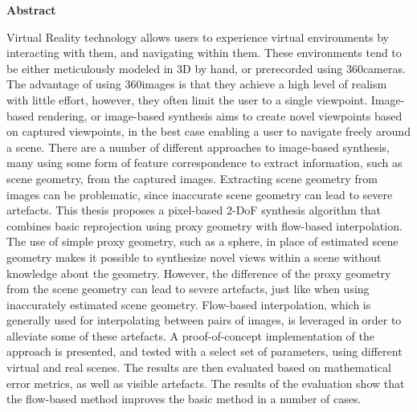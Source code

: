 \vspace*{2cm}

\begin{center}
    \textbf{Abstract}
\end{center}

\vspace*{1cm}

\noindent 
Virtual Reality technology allows users to experience virtual environments by interacting with them, and navigating within them. These environments tend to be either meticulously modeled in 3D by hand, or prerecorded using 360\degree cameras. The advantage of using 360\degree images is that they achieve a high level of realism with little effort, however, they often limit the user to a single viewpoint.
Image-based rendering, or image-based synthesis aims to create novel viewpoints based on captured viewpoints, in the best case enabling a user to navigate freely around a scene.
There are a number of different approaches to image-based synthesis, many using some form of feature correspondence to extract information, such as scene geometry, from the captured images. Extracting scene geometry from images can be problematic, since inaccurate scene geometry can lead to severe artefacts.
This thesis proposes a pixel-based 2-DoF synthesis algorithm that combines basic reprojection using proxy geometry with flow-based interpolation.
The use of simple proxy geometry, such as a sphere, in place of estimated scene geometry makes it possible to synthesize novel views within a scene without knowledge about the geometry.
However, the difference of the proxy geometry from the scene geometry can lead to severe artefacts, just like when using inaccurately estimated scene geometry.
Flow-based interpolation, which is generally used for interpolating between pairs of images, is leveraged in order to alleviate some of these artefacts.
A proof-of-concept implementation of the approach is presented, and tested with a select set of parameters, using different virtual and real scenes.
The results are then evaluated based on mathematical error metrics, as well as visible artefacts. The results of the evaluation show that the flow-based method improves the basic method in a number of cases.

